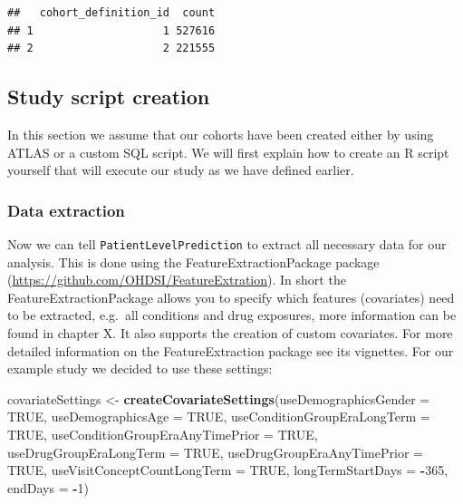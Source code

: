\documentclass[]{book}
\newenvironment{Shaded}{\begin{snugshade}}{\end{snugshade}}
\newcommand{\KeywordTok}[1]{\textcolor[rgb]{0.13,0.29,0.53}{\textbf{#1}}}
\newcommand{\DataTypeTok}[1]{\textcolor[rgb]{0.13,0.29,0.53}{#1}}
\newcommand{\DecValTok}[1]{\textcolor[rgb]{0.00,0.00,0.81}{#1}}
\newcommand{\StringTok}[1]{\textcolor[rgb]{0.31,0.60,0.02}{#1}}
\newcommand{\OtherTok}[1]{\textcolor[rgb]{0.56,0.35,0.01}{#1}}
\newcommand{\OperatorTok}[1]{\textcolor[rgb]{0.81,0.36,0.00}{\textbf{#1}}}
\newcommand{\NormalTok}[1]{#1}
\begin{document}
\begin{verbatim}
##   cohort_definition_id  count
## 1                    1 527616
## 2                    2 221555
\end{verbatim}

\subsection{Study script creation}\label{study-script-creation}

In this section we assume that our cohorts have been created either by
using ATLAS or a custom SQL script. We will first explain how to create
an R script yourself that will execute our study as we have defined
earlier.

\subsubsection{Data extraction}\label{data-extraction}

Now we can tell \texttt{PatientLevelPrediction} to extract all necessary
data for our analysis. This is done using the FeatureExtractionPackage
package (\url{https://github.com/OHDSI/FeatureExtration}). In short the
FeatureExtractionPackage allows you to specify which features
(covariates) need to be extracted, e.g.~all conditions and drug
exposures, more information can be found in chapter X. It also supports
the creation of custom covariates. For more detailed information on the
FeatureExtraction package see its vignettes. For our example study we
decided to use these settings:

\begin{Shaded}
\begin{Highlighting}[]
\NormalTok{covariateSettings <-}\StringTok{ }\KeywordTok{createCovariateSettings}\NormalTok{(}\DataTypeTok{useDemographicsGender =} \OtherTok{TRUE}\NormalTok{,}
                                             \DataTypeTok{useDemographicsAge =} \OtherTok{TRUE}\NormalTok{,}
                                             \DataTypeTok{useConditionGroupEraLongTerm =} \OtherTok{TRUE}\NormalTok{,}
                                             \DataTypeTok{useConditionGroupEraAnyTimePrior =} \OtherTok{TRUE}\NormalTok{,}
                                             \DataTypeTok{useDrugGroupEraLongTerm =} \OtherTok{TRUE}\NormalTok{,}
                                             \DataTypeTok{useDrugGroupEraAnyTimePrior =} \OtherTok{TRUE}\NormalTok{,}
                                             \DataTypeTok{useVisitConceptCountLongTerm =} \OtherTok{TRUE}\NormalTok{,}
                                             \DataTypeTok{longTermStartDays =} \OperatorTok{-}\DecValTok{365}\NormalTok{,}
                                             \DataTypeTok{endDays =} \OperatorTok{-}\DecValTok{1}\NormalTok{)}
\end{Highlighting}
\end{Shaded}
\end{document}
